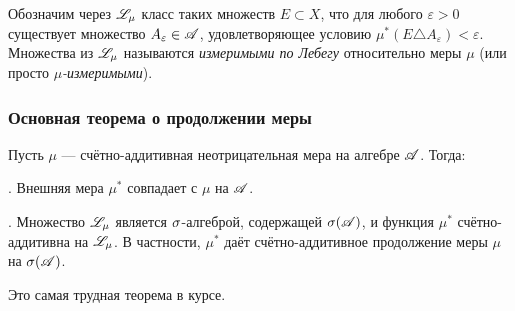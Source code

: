 \documentclass[10pt]{article}
\newcommand{\ve}{\varepsilon}
\begin{document}
\begin{df}
Обозначим через $\mathscr{L}_{\mu}$ класс таких множеств $E\subset X$, что
для любого $\ve>0$ существует множество $A_{\ve}\in\As$,
удовлетворяющее условию $\mu^*(E\triangle A_{\ve})<\ve$. Множества
из $\mathscr{L}_{\mu}$ называются \emph{измеримыми по Лебегу} относительно
меры $\mu$ (или просто \emph{$\mu$-измеримыми}).
\end{df}

\subsubsection{Основная теорема о продолжении меры}

\begin{theorem}\label{continue_measure}
Пусть $\mu$ --- счётно-аддитивная неотрицательная мера на алгебре
$\mathscr{A}$. Тогда:

. Внешняя мера $\mu^*$ совпадает с $\mu$ на $\mathscr{A}$.

. Множество $\mathscr{L}_{\mu}$ является $\sigma$-алгеброй, содержащей
$\sigma(\mathscr{A})$, и функция $\mu^*$ счётно-аддитивна на $\mathscr{L}_{\mu}$. В
частности, $\mu^*$ даёт счётно-аддитивное продолжение меры $\mu$ на
$\sigma(\mathscr{A})$.
\end{theorem}

\begin{note}
Это самая трудная теорема в курсе.
\end{note}
\end{document}
